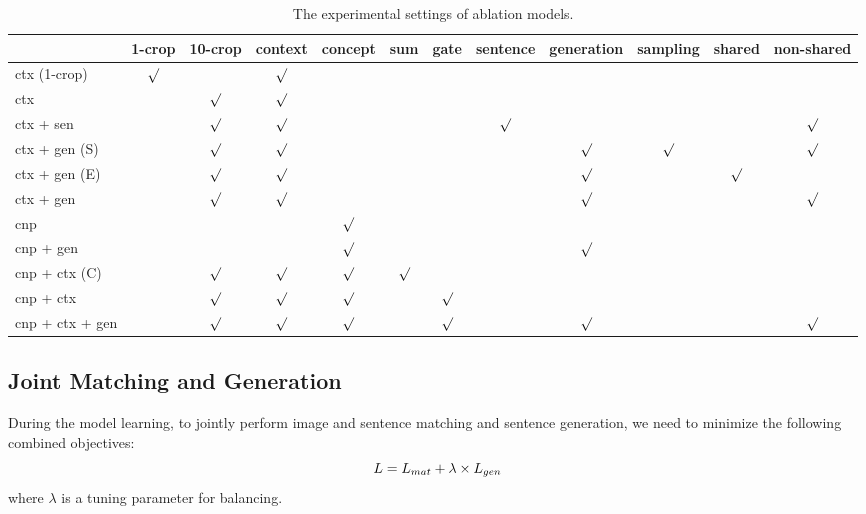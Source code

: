 \documentclass[10pt,twocolumn,letterpaper]{article}
\begin{document}
\begin{table*}[t] \small
\addtolength{\tabcolsep}{-2pt}
\centering
\caption{The experimental settings of ablation models.}
\begin{tabular}{l|cc|cc|cc|ccc|cc}
\hline
\hline

       & 1-crop & 10-crop  & context  & concept  & sum  & gate & sentence  & generation  & sampling & shared & non-shared\\
\hline



ctx (1-crop)          & ${\surd}$ & &${\surd}$ & & & & & & & & \\
ctx                     & &${\surd}$ &${\surd}$ & & & & & & & & \\
\hline
ctx + sen     & &${\surd}$ &${\surd}$ & & & &${\surd}$ & & & &${\surd}$ \\
ctx + gen (S)     & &${\surd}$ &${\surd}$ & & & & &${\surd}$ &${\surd}$ & &${\surd}$ \\
ctx + gen (E)     & &${\surd}$ &${\surd}$ & & & & &${\surd}$ & &${\surd}$ & \\
ctx + gen                 & &${\surd}$ &${\surd}$ & & & & &${\surd}$ & & &${\surd}$ \\
\hline
cnp                   & & & &${\surd}$ & & & & & & & \\
cnp + gen          & & & &${\surd}$ & & & &${\surd}$ & & & \\
cnp + ctx (C)     & &${\surd}$ &${\surd}$ &${\surd}$ &${\surd}$ & & & & & & \\
cnp + ctx        & &${\surd}$ &${\surd}$ &${\surd}$ & &${\surd}$ & & & & & \\
\hline
cnp + ctx + gen     & &${\surd}$ &${\surd}$ &${\surd}$ & &${\surd}$ & &${\surd}$ & & &${\surd}$ \\


\hline
\hline
\end{tabular}

\label{table:ablation}
\end{table*}



\subsection{Joint Matching and Generation}

During the model learning, to jointly perform image and sentence matching and sentence generation,
we need to minimize the following combined objectives:
\begin{equation} \label{eqn:e6}
\setlength{\abovedisplayskip}{5pt}
\setlength{\belowdisplayskip}{5pt}
L = L_{mat} + \lambda \times L_{gen}
\end{equation}
where $\lambda$ is a tuning parameter for balancing.
\end{document}
